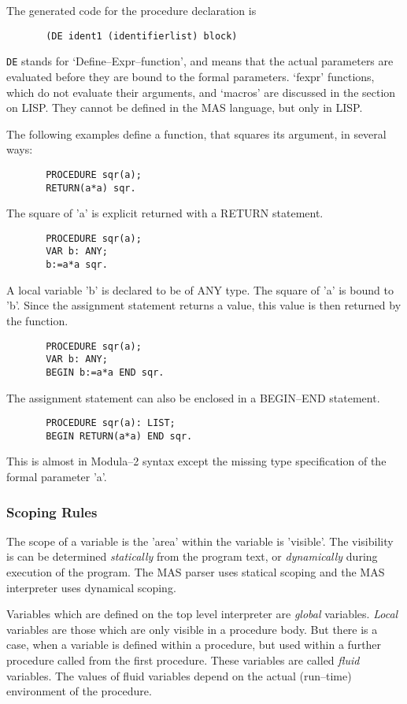 {\small
The generated code for the procedure declaration is
\begin{verbatim}
       (DE ident1 (identifierlist) block) 
\end{verbatim}
\verb/DE/ stands for `Define--Expr--function', and 
means that the actual parameters are evaluated before
they are bound to the formal parameters.
`fexpr' functions, which do not evaluate their 
arguments, and `macros' are discussed in the 
section on LISP. They cannot be defined in the
MAS language, but only in LISP.
}

The following examples define 
a function, that squares its argument, in  
several ways:
\begin{verbatim}
       PROCEDURE sqr(a);
       RETURN(a*a) sqr.
\end{verbatim}
The square of 'a' is explicit returned
with a RETURN statement.

\begin{verbatim}
       PROCEDURE sqr(a);
       VAR b: ANY; 
       b:=a*a sqr.
\end{verbatim}
A local variable 'b' is declared to be of ANY type.
The square of 'a' is bound to 'b'. 
Since the assignment statement returns a value,
this value is then returned by the function. 

\begin{verbatim}
       PROCEDURE sqr(a);
       VAR b: ANY; 
       BEGIN b:=a*a END sqr.
\end{verbatim}
The assignment statement can also be enclosed in a BEGIN--END
statement. 

\begin{verbatim}
       PROCEDURE sqr(a): LIST;
       BEGIN RETURN(a*a) END sqr.
\end{verbatim}
This is almost in Modula--2 syntax except the
missing type specification of the
formal parameter 'a'.

\subsubsection{Scoping Rules}

The scope of a variable is the 'area' within
the variable is 'visible'. 
The visibility is can be determined {\em statically} from
the program text, or {\em dynamically} during
execution of the program. 
The MAS parser uses statical scoping and
the MAS interpreter uses dynamical scoping.

Variables which are defined on the top level
interpreter are {\em global} variables.
{\em Local} variables are those which are 
only visible in a procedure body.
But there is a case, when a variable is 
defined within a procedure, but used within
a further procedure called from the first procedure.
These variables are called {\em fluid} variables.
The values of fluid variables depend on the actual (run--time)
environment of the procedure.

